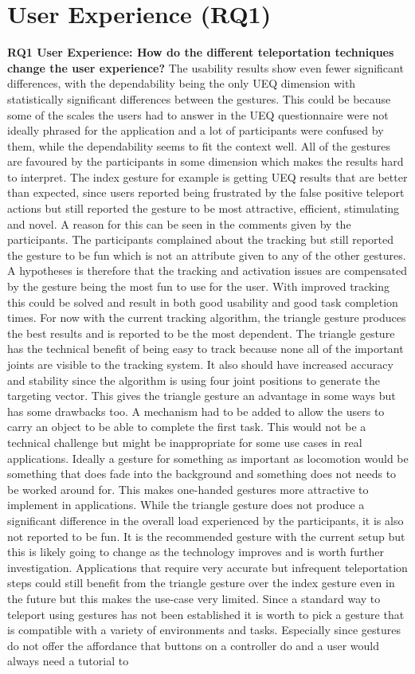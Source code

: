 \section{User Experience (RQ1)}
\textbf{RQ1 User Experience: How do the different teleportation techniques change the user experience?}
The usability results show even fewer significant differences, with the dependability being the only UEQ dimension with statistically significant differences between the gestures. This could be because some of the scales the users had to answer in the UEQ questionnaire were not ideally phrased for the application and a lot of participants were confused by them, while the dependability seems to fit the context well. All of the gestures are favoured by the participants in some dimension which makes the results hard to interpret. The index gesture for example is getting UEQ results that are better than expected, since users reported being frustrated by the false positive teleport actions but still reported the gesture to be most attractive, efficient, stimulating and novel. A reason for this can be seen in the comments given by the participants. The participants complained about the tracking but still reported the gesture to be fun which is not an attribute given to any of the other gestures. A hypotheses is therefore that the tracking and activation issues are compensated by the gesture being the most fun to use for the user. With improved tracking this could be solved and result in both good usability and good task completion times. For now with the current tracking algorithm, the triangle gesture produces the best results and is reported to be the most dependent. The triangle gesture has the technical benefit of being easy to track because none all of the important joints are visible to the tracking system. It also should have increased accuracy and stability since the algorithm is using four joint positions to generate the targeting vector. This gives the triangle gesture an advantage in some ways but has some drawbacks too. A mechanism had to be added to allow the users to carry an object to be able to complete the first task. This would not be a technical challenge but might be inappropriate for some use cases in real applications. Ideally a gesture for something as important as locomotion would be something that does fade into the background and something does not needs to be worked around for. This makes one-handed gestures more attractive to implement in applications. While the triangle gesture does not produce a significant difference in the overall load experienced by the participants, it is also not reported to be fun. It is the recommended gesture with the current setup but this is likely going to change as the technology improves and is worth further investigation. Applications that require very accurate but infrequent teleportation steps could still benefit from the triangle gesture over the index gesture even in the future but this makes the use-case very limited. Since a standard way to teleport using gestures has not been established it is worth to pick a gesture that is compatible with a variety of environments and tasks. Especially since gestures do not offer the affordance that buttons on a controller do and a user would always need a tutorial to 